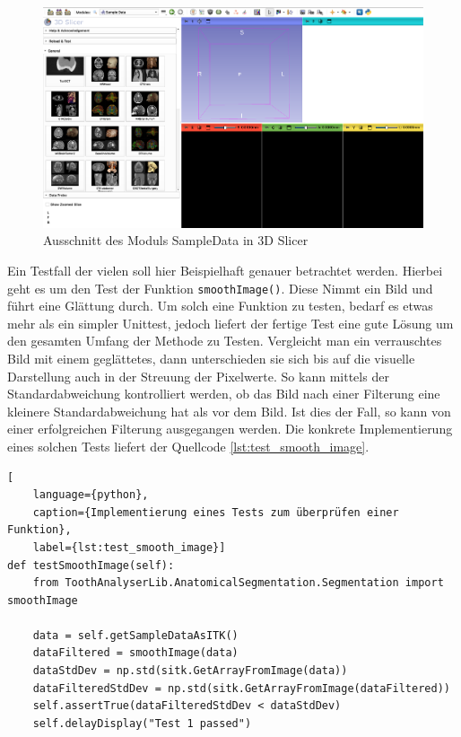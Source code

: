 \begin{figure}[h]
	\centering
	\includegraphics[width=1\textwidth]{img/sampleData.png}
	\caption{Ausschnitt des Moduls SampleData in 3D Slicer}
	\label{fig:sample_data}
\end{figure}

Ein Testfall der vielen soll hier Beispielhaft genauer betrachtet werden.
Hierbei geht es um den Test der Funktion \texttt{smoothImage()}. Diese Nimmt ein
Bild und führt eine Glättung durch. Um solch eine Funktion zu testen, bedarf es
etwas mehr als ein simpler Unittest, jedoch liefert der fertige Test eine gute Lösung
um den gesamten Umfang der Methode zu Testen. Vergleicht man ein verrauschtes
Bild mit einem geglättetes, dann unterschieden sie sich bis auf die visuelle Darstellung
auch in der Streuung der Pixelwerte. So kann mittels der Standardabweichung
kontrolliert werden, ob das Bild nach einer Filterung eine kleinere Standardabweichung
hat als vor dem Bild. Ist dies der Fall, so kann von einer erfolgreichen Filterung
ausgegangen werden. Die konkrete Implementierung eines solchen Tests liefert der
Quellcode \ref{lst:test_smooth_image}.

\begin{lstlisting}[
    language={python},
    caption={Implementierung eines Tests zum überprüfen einer Funktion},
    label={lst:test_smooth_image}]
def testSmoothImage(self):
    from ToothAnalyserLib.AnatomicalSegmentation.Segmentation import smoothImage
   
    data = self.getSampleDataAsITK()
    dataFiltered = smoothImage(data)
    dataStdDev = np.std(sitk.GetArrayFromImage(data))
    dataFilteredStdDev = np.std(sitk.GetArrayFromImage(dataFiltered))
    self.assertTrue(dataFilteredStdDev < dataStdDev)
    self.delayDisplay("Test 1 passed")
\end{lstlisting}

